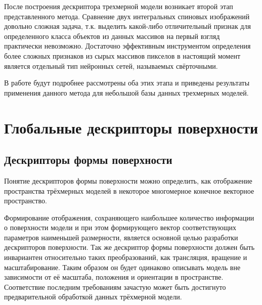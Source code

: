 \documentclass[14pt]{article}
\numberwithin{figure}{section}
\numberwithin{equation}{section}
\begin{document}
После построения дескриптора трехмерной модели возникает второй этап представленного метода. Сравнение двух интегральных спиновых изображений довольно сложная задача, т.к. выделить какой-либо отличительный признак для определенного класса объектов из данных массивов на первый взгляд практически невозможно. Достаточно эффективным инструментом определения более сложных признаков из сырых массивов пикселов в настоящий момент является отдельный тип нейронных сетей, называемых свёрточными.

В работе будут подробнее рассмотрены оба этих этапа и приведены результаты применения данного метода для небольшой базы данных трехмерных моделей.

\section{Глобальные дескрипторы поверхности}

\subsection{Дескрипторы формы поверхности}

Понятие дескрипторов формы поверхности можно определить, как отображение пространства трёхмерных моделей в некоторое многомерное конечное векторное пространство.

Формирование отображения, сохраняющего наибольшее количество информации о поверхности модели и при этом формирующего вектор соответствующих параметров наименьшей размерности, является основной целью разработки дескрипторов поверхности. Так же дескриптор формы поверхности должен быть инвариантен относительно таких преобразований, как трансляция, вращение и масштабирование. Таким образом он будет одинаково описывать модель вне зависимости от её масштаба, положения и ориентации в пространстве. Соответствие последним требованиям зачастую может быть достигнуто предварительной обработкой данных трёхмерной модели.

%
\end{document}

